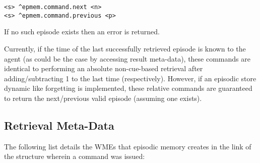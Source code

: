 \begin{verbatim}
<s> ^epmem.command.next <n>
<s> ^epmem.command.previous <p>
\end{verbatim}

If no such episode exists then an error is returned.

Currently, if the time of the last successfully retrieved episode is known to the agent (as could be the case by accessing result meta-data), these commands are identical to performing an absolute non-cue-based retrieval after adding/subtracting 1 to the last time (respectively).  
However, if an episodic store dynamic like forgetting is implemented, these relative commands are guaranteed to return the next/previous valid episode (assuming one exists).

\subsection{Retrieval Meta-Data}
\label{EPMEM-meta}

The following list details the WMEs that episodic memory creates in the  link of the  structure wherein a command was issued:

